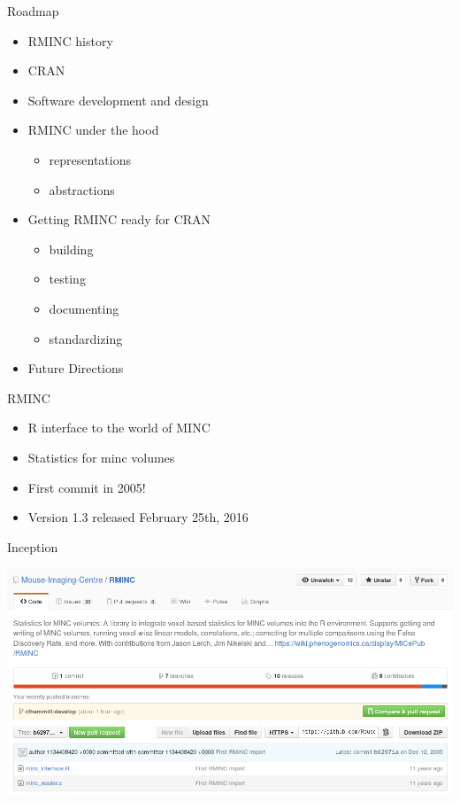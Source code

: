 \begin{frame}{Roadmap}

\begin{itemize}
\tightlist
\item
  RMINC history
\item
  CRAN
\item
  Software development and design
\item
  RMINC under the hood

  \begin{itemize}
  \tightlist
  \item
    representations
  \item
    abstractions
  \end{itemize}
\item
  Getting RMINC ready for CRAN

  \begin{itemize}
  \tightlist
  \item
    building
  \item
    testing
  \item
    documenting
  \item
    standardizing
  \end{itemize}
\item
  Future Directions
\end{itemize}

\end{frame}

\begin{frame}{RMINC}

\begin{itemize}
\tightlist
\item
  R interface to the world of MINC
\item
  Statistics for minc volumes
\item
  First commit in 2005!
\item
  Version 1.3 released February 25th, 2016
\end{itemize}

\end{frame}

\begin{frame}{Inception}

\includegraphics{RMINC_commit_one.png}

\end{frame}

